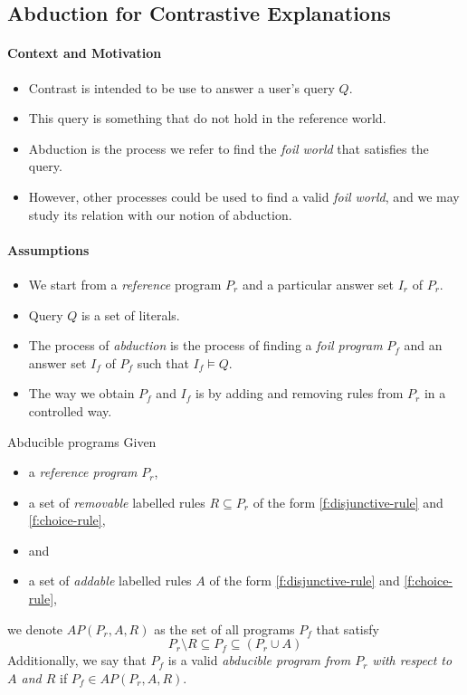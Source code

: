 \subsection{Abduction for Contrastive Explanations}

\paragraph{Context and Motivation}
\begin{itemize}
  \item Contrast is intended to be use to answer a user's query $Q$.
  \item This query is something that do not hold in the reference world.
  \item Abduction is the process we refer to find the \emph{foil world} that satisfies the query.
  \item However, other processes could be used to find a valid \emph{foil world}, and we may study its relation with our notion of abduction.
\end{itemize}

\paragraph{Assumptions}
\begin{itemize}
  \item We start from a \emph{reference} program $P_r$ and a particular answer set $I_r$ of $P_r$.
  \item Query $Q$ is a set of literals.
  \item The process of \emph{abduction} is the process of finding a \emph{foil program} $P_f$ and an answer set $I_f$ of $P_f$ such that $I_f \models Q$.
  \item The way we obtain $P_f$ and $I_f$ is by adding and removing rules from $P_r$ in a controlled way.
\end{itemize}
%

%
\begin{definition}{Abducible programs}
  Given
  \begin{itemize}
    \item a \emph{reference program} $P_r$,
    \item a set of \emph{removable} labelled rules $R \subseteq P_r$ of the form \eqref{f:disjunctive-rule} and \eqref{f:choice-rule},
    \item and
    \item a set of \emph{addable} labelled rules $A$ of the form \eqref{f:disjunctive-rule} and \eqref{f:choice-rule},
  \end{itemize}
  we denote $AP(P_r, A, R)$ as the set of all programs $P_f$ that satisfy
  \[
    P_r \setminus R \subseteq P_f \subseteq (P_r \cup A)
  \]
  Additionally, we say that $P_f$ is a valid \emph{abducible program from $P_r$ with respect to $A$ and $R$} if $P_f \in AP(P_r, A, R)$.
\end{definition}
%

